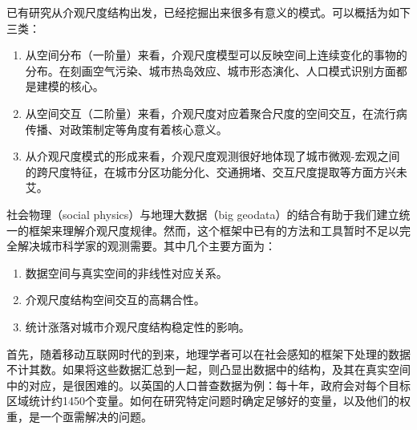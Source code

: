 
已有研究从介观尺度结构出发，已经挖掘出来很多有意义的模式。可以概括为如下三类：\begin{enumerate}
    \item 从空间分布（一阶量）来看，介观尺度模型可以反映空间上连续变化的事物的分布。在刻画空气污染\cite{mijling2012using}、城市热岛效应、城市形态演化\cite{raimbault2018calibration}、人口模式识别方面都是建模的核心。
    \item 从空间交互（二阶量）来看，介观尺度对应着聚合尺度的空间交互，在流行病传播、对政策制定等角度有着核心意义。%
    \item 从介观尺度模式的形成来看，介观尺度观测很好地体现了城市微观-宏观之间的跨尺度特征，在城市分区功能分化、交通拥堵、交互尺度提取等方面方兴未艾。
\end{enumerate} 


社会物理（social physics）与地理大数据（big geodata）的结合有助于我们建立统一的框架来理解介观尺度规律。然而，这个框架中已有的方法和工具暂时不足以完全解决城市科学家的观测需要。其中几个主要方面为：\begin{enumerate}
    \item 数据空间与真实空间的非线性对应关系。
    \item 介观尺度结构空间交互的高耦合性。
    \item 统计涨落对城市介观尺度结构稳定性的影响。
\end{enumerate} 首先，随着移动互联网时代的到来，地理学者可以在社会感知的框架下处理的数据不计其数。如果将这些数据汇总到一起，则凸显出数据中的结构，及其在真实空间中的对应，是很困难的。以英国的人口普查数据为例：每十年，政府会对每个目标区域统计约1450个变量。如何在研究特定问题时确定足够好的变量，以及他们的权重，是一个亟需解决的问题。



